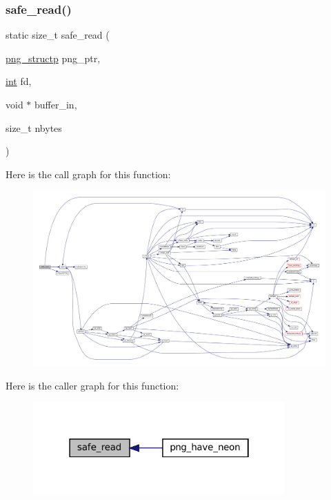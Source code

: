 \subsubsection{\texorpdfstring{safe\+\_\+read()}{safe\_read()}}
{\footnotesize\ttfamily static size\+\_\+t safe\+\_\+read (\begin{DoxyParamCaption}\item[{\mbox{\hyperlink{png_8h_a05b958915368d6bbd797ef70f24b9ff6}{png\+\_\+structp}}}]{png\+\_\+ptr,  }\item[{\mbox{\hyperlink{ioapi_8h_a787fa3cf048117ba7123753c1e74fcd6}{int}}}]{fd,  }\item[{void $\ast$}]{buffer\+\_\+in,  }\item[{size\+\_\+t}]{nbytes }\end{DoxyParamCaption})\hspace{0.3cm}{\ttfamily [static]}}

Here is the call graph for this function\+:
\nopagebreak
\begin{figure}[H]
\begin{center}
\leavevmode
\includegraphics[width=350pt]{linux-auxv_8c_a23ad580f6c3e8b4e8afd2c07d37913d2_cgraph}
\end{center}
\end{figure}
Here is the caller graph for this function\+:
\nopagebreak
\begin{figure}[H]
\begin{center}
\leavevmode
\includegraphics[width=274pt]{linux-auxv_8c_a23ad580f6c3e8b4e8afd2c07d37913d2_icgraph}
\end{center}
\end{figure}
